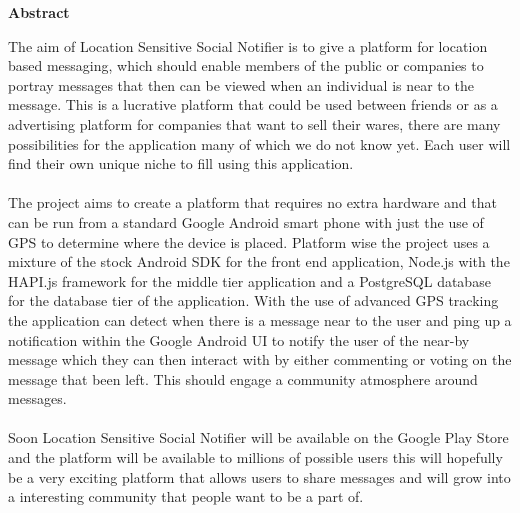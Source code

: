 \thispagestyle{empty}

\begin{center}
    {\LARGE\bf Abstract}
\end{center}

\noindent
The aim of Location Sensitive Social Notifier is to give a platform for location based messaging, which should enable members of the public or companies to portray messages that then can be viewed when an individual is near to the message. This is a lucrative platform that could be used between friends or as a advertising platform for companies that want to sell their wares, there are many possibilities for the application many of which we do not know yet.  Each user will find their own unique niche to fill using this application.\\
\\
The project aims to create a platform that requires no extra hardware and that can be run from a standard Google Android smart phone with just the use of GPS to determine where the device is placed. Platform wise the project uses a mixture of the stock Android SDK \cite{Google:androidAPIDocs:2015:online} for the front end application, Node.js\cite{nodeteam:node:2015:online} with the HAPI.js\cite{hapiteam:hapti:2015:online} framework for the middle tier application and a PostgreSQL\cite{Postgres:APIDocumentation:2015:online} database for the database tier of the application. With the use of advanced GPS tracking the application can detect when there is a message near to the user and ping up a notification within the Google Android UI to notify the user of the near-by message which they can then interact with by either commenting or voting on the message that been left.  This should engage a community atmosphere around messages.\\ 
\\
Soon Location Sensitive Social Notifier will be available on the Google Play Store and the platform will be available to millions of possible users this will hopefully be a very exciting platform that allows users to share messages and will grow into a interesting community that people want to be a part of.
